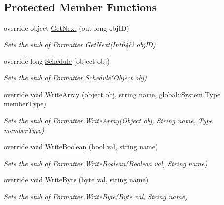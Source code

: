 \subsection*{Protected Member Functions}
\begin{DoxyCompactItemize}
\item 
override object \hyperlink{class_system_1_1_runtime_1_1_serialization_1_1_fakes_1_1_stub_formatter_aabf5913ef750ddc6445c6943dde8fab5}{Get\-Next} (out long obj\-I\-D)
\begin{DoxyCompactList}\small\item\em Sets the stub of Formatter.\-Get\-Next(Int64\& obj\-I\-D)\end{DoxyCompactList}\item 
override long \hyperlink{class_system_1_1_runtime_1_1_serialization_1_1_fakes_1_1_stub_formatter_a4c0017478a179751e8f64af3cf256037}{Schedule} (object obj)
\begin{DoxyCompactList}\small\item\em Sets the stub of Formatter.\-Schedule(\-Object obj)\end{DoxyCompactList}\item 
override void \hyperlink{class_system_1_1_runtime_1_1_serialization_1_1_fakes_1_1_stub_formatter_aefe16272eac84f2475a2ad5317a9007e}{Write\-Array} (object obj, string name, global\-::\-System.\-Type member\-Type)
\begin{DoxyCompactList}\small\item\em Sets the stub of Formatter.\-Write\-Array(\-Object obj, String name, Type member\-Type)\end{DoxyCompactList}\item 
override void \hyperlink{class_system_1_1_runtime_1_1_serialization_1_1_fakes_1_1_stub_formatter_a11b5d0bf5ed0bb026c7e753cc9d60b53}{Write\-Boolean} (bool \hyperlink{jquery-1_810_82-vsdoc_8js_a0888cacd53defa08fbb4972d54ece4b0}{val}, string name)
\begin{DoxyCompactList}\small\item\em Sets the stub of Formatter.\-Write\-Boolean(\-Boolean val, String name)\end{DoxyCompactList}\item 
override void \hyperlink{class_system_1_1_runtime_1_1_serialization_1_1_fakes_1_1_stub_formatter_a1129e03f8e9a3a067c23b761bfe5c39d}{Write\-Byte} (byte \hyperlink{jquery-1_810_82-vsdoc_8js_a0888cacd53defa08fbb4972d54ece4b0}{val}, string name)
\begin{DoxyCompactList}\small\item\em Sets the stub of Formatter.\-Write\-Byte(\-Byte val, String name)\end{DoxyCompactList}\item 

\end{DoxyCompactItemize}
